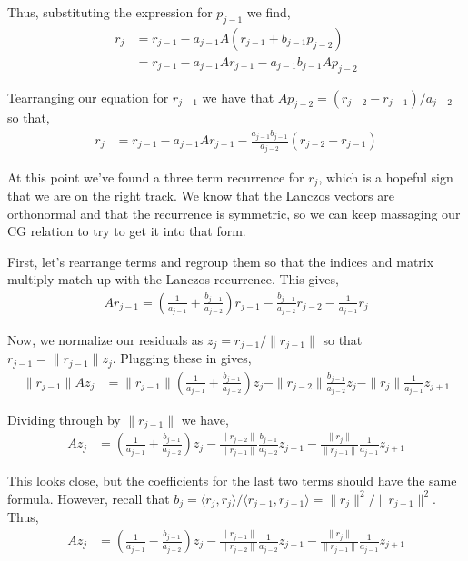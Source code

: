 \documentclass[10pt]{article}
\begin{document}
Thus, substituting the expression for \(p_{j-1}\) we find,
\begin{align*}
r_j &= r_{j-1} - a_{j-1} A(r_{j-1} + b_{j-1} p_{j-2})
\\&= r_{j-1} - a_{j-1} Ar_{j-1} - a_{j-1}b_{j-1} A p_{j-2}
\end{align*}

Tearranging our equation for \(r_{j-1}\) we have that \(Ap_{j-2} = (r_{j-2} - r_{j-1}) / a_{j-2}\) so that,
\begin{align*}
    r_j &= r_{j-1} - a_{j-1} Ar_{j-1} - \frac{a_{j-1}b_{j-1}}{a_{j-2}}(r_{j-2} - r_{j-1})
\end{align*}

At this point we've found a three term recurrence for \(r_j\), which is a hopeful sign that we are on the right track.
We know that the Lanczos vectors are orthonormal and that the recurrence is symmetric, so we can keep massaging our CG relation to try to get it into that form.

First, let's rearrange terms and regroup them so that the indices and matrix multiply match up with the Lanczos recurrence. This gives,
\begin{align*}
    Ar_{j-1} = \left(\frac{1}{a_{j-1}}+\frac{b_{j-1}}{a_{j-2}}\right) r_{j-1} - \frac{b_{j-1}}{a_{j-2}} r_{j-2} - \frac{1}{a_{j-1}} r_{j}
\end{align*}

Now, we normalize our residuals as \(z_j = r_{j-1}/\|r_{j-1}\|\) so that \(r_{j-1} = \|r_{j-1}\| z_j\). Plugging these in gives,
\begin{align*}
    \|r_{j-1}\|Az_{j} &= \|r_{j-1}\|\left(\frac{1}{a_{j-1}}+\frac{b_{j-1}}{a_{j-2}}\right) z_{j} 
    -\|r_{j-2}\|\frac{b_{j-1}}{a_{j-2}} z_{j} - \|r_j\| \frac{1}{a_{j-1}} z_{j+1}
\end{align*}

Dividing through by \(\|r_{j-1}\|\) we have,
\begin{align*}
    Az_{j} &= \left(\frac{1}{a_{j-1}}+\frac{b_{j-1}}{a_{j-2}}\right) z_{j} 
    - \frac{\|r_{j-2}\|}{\|r_{j-1}\|}\frac{b_{j-1}}{a_{j-2}} z_{j-1} - \frac{\|r_j\|}{\|r_{j-1}\|} \frac{1}{a_{j-1}} z_{j+1}
\end{align*}

This looks close, but the coefficients for the last two terms should have the same formula. However, recall that \(b_{j} = \langle r_j,r_j \rangle / \langle r_{j-1},r_{j-1} \rangle = \|r_j\|^2 / \|r_{j-1}\|^2\). Thus,
\begin{align*}
    Az_{j} &= \left(\frac{1}{a_{j-1}}-\frac{b_{j-1}}{a_{j-2}}\right) z_{j} 
    - \frac{\|r_{j-1}\|}{\|r_{j-2}\|}\frac{1}{a_{j-2}} z_{j-1} - \frac{\|r_j\|}{\|r_{j-1}\|} \frac{1}{a_{j-1}} z_{j+1}
\end{align*}
\end{document}
